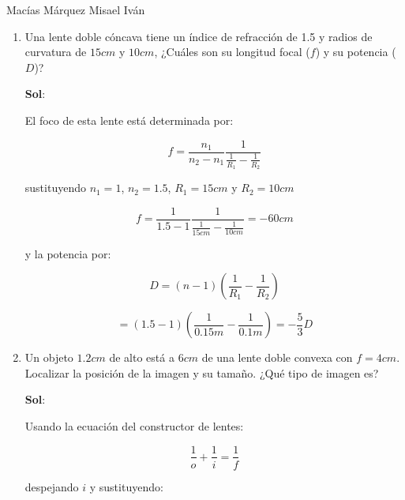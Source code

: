 \documentclass[12pt,a4paper]{article}
\begin{document}
Macías Márquez Misael Iván

\begin{enumerate}






\item Una lente doble cóncava tiene un índice de refracción de 1.5 y radios de curvatura de $15cm$ y $10cm$, ¿Cuáles son su longitud focal ($f$) y su potencia ($D$)?

\textbf{Sol}:

El foco de esta lente está determinada por:

\begin{equation*}
    f = \frac{n_1}{n_2 - n_1} \frac{1}{\frac{1}{R_1}- \frac{1}{R_2}}
\end{equation*}

sustituyendo $n_1 = 1$, $n_2 =1.5$, $R_1 = 15 cm$ y $R_2 = 10cm$

\begin{equation*}
    f = \frac{1}{1.5- 1} \frac{1}{\frac{1}{15 cm} - \frac{1}{10cm}}= -60cm
\end{equation*}

y la potencia por:

\begin{equation*}
    D = (n-1)\left(\frac{1}{R_1} - \frac{1}{R_2}\right)
\end{equation*}

\begin{equation*}
    = (1.5 - 1) \left(\frac{1}{0.15m}- \frac{1}{0.1m}\right)= -\frac{5}{3} D
\end{equation*}













\item Un objeto $1.2cm$ de alto está a $6cm$ de una lente doble convexa con $f=4cm$. Localizar la posición de la imagen y su tamaño. ¿Qué tipo de imagen es?

\textbf{Sol}:

Usando la ecuación del constructor de lentes:

\begin{equation*}
    \frac{1}{o} + \frac{1}{i} = \frac{1}{f}
\end{equation*}

despejando $i$ y sustituyendo:


\end{enumerate}
\end{document}
